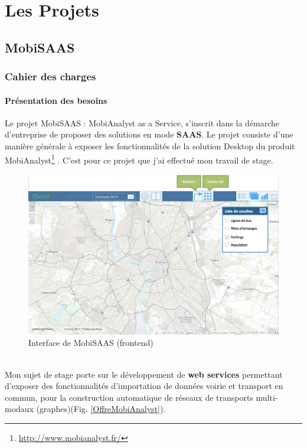 \chapter{Les Projets}
\label{Developpement}

\section{MobiSAAS}

\subsection{Cahier des charges}

\subsubsection{Présentation des besoins}

Le projet \og MobiSAAS \fg : MobiAnalyst as a Service, s'inscrit dans la démarche d'entreprise de proposer des solutions en mode \textbf{SAAS}. Le projet consiste d'une manière générale à exposer les fonctionnalités de la solution Desktop du produit \og MobiAnalyst\footnote{\url{http://www.mobianalyst.fr/}} \fg. C'est pour ce projet que j'ai effectué mon travail de stage. \\

\begin{figure}[!h]
\centering
\includegraphics[width=16cm]{images/MobiSAAS_IHM.png}
\caption{\label{MobiSAAS_IHM.png}Interface de MobiSAAS (frontend)}
\end{figure} 
\\


Mon sujet de stage porte sur le développement de \textbf{web services} permettant d'exposer des fonctionnalités d'importation de données voirie et transport en commun, pour la construction automatique de réseaux de transports multi-modaux (graphes)(Fig. \ref{OffreMobiAnalyst}). \\

